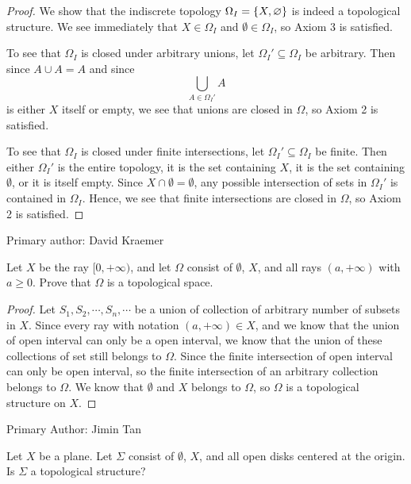 \begin{proof}
    We show that the indiscrete topology $\Omega_I = \{X, \varnothing\}$ is
    indeed a topological structure. We see immediately that $X \in \Omega_I$ and
    $\emptyset \in \Omega_I$, so Axiom 3 is satisfied.

    To see that $\Omega_I$ is closed under arbitrary unions, let $\Omega_I'
    \subseteq \Omega_I$ be arbitrary. Then since $A \cup A = A$ and since 
    \[
         \bigcup_{A \in \Omega_I'} A
    \]
    is either $X$ itself or empty, we see that unions are closed in $\Omega$, so
    Axiom 2 is satisfied.

    To see that $\Omega_I$ is closed under finite intersections, let $\Omega_I'
    \subseteq \Omega_I$ be finite. Then either $\Omega_I'$ is the entire
    topology, it is the set containing $X$, it is the set containing
    $\emptyset$, or it is itself empty. Since $X \cap \emptyset = \emptyset$,
    any possible intersection of sets in $\Omega_I'$ is contained in $\Omega_I$.
    Hence, we see that finite intersections are closed in $\Omega$, so Axiom 2
    is satisfied.
\end{proof}
Primary author: David Kraemer

\begin{minorEx} %
    Let $X$ be the ray $[0, +\infty)$, and let $\Omega$ consist of $\emptyset$, %
    $X$, and all rays $(a, +\infty)$ with $a \geq 0$. Prove that $\Omega$ is
    a topological space.
\end{minorEx}

\begin{proof}
Let $S_1, S_2, \cdots, S_n, \cdots$ be a union of collection of arbitrary number of subsets in $X$. Since every ray with notation $(a, +\infty) \in X$, and we know that the union of open interval can only be a open interval, we know that the union of these collections of set still belongs to $\Omega$. Since the finite intersection of open interval can only be open interval, so the finite intersection of an arbitrary collection belongs to $\Omega$. We know that $\emptyset$ and $X$ belongs to $\Omega$, so $\Omega$ is a topological structure on $X$.
\end{proof}

Primary Author: Jimin Tan

\begin{minorEx} %
    Let $X$ be a plane. Let $\Sigma$ consist of $\emptyset$, $X$, and all open
    disks centered at the origin. Is $\Sigma$ a topological structure?
\end{minorEx}

